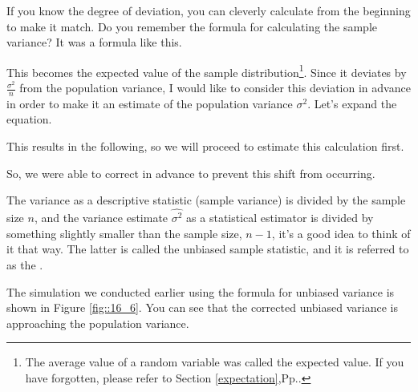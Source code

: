 \documentclass{ltjsbook}
\begin{document}
If you know the degree of deviation, you can cleverly calculate from the beginning to make it match. Do you remember the formula for calculating the sample variance? It was a formula like this.

This becomes the expected value of the sample distribution\footnote{The average value of a random variable was called the expected value. If you have forgotten, please refer to Section \ref{expectation},Pp.\pageref{expectation}.}. Since it deviates by $\frac{\sigma^2}{n}$ from the population variance, I would like to consider this deviation in advance in order to make it an estimate of the population variance $\sigma^2$. Let's expand the equation.

This results in the following, so we will proceed to estimate this calculation first.

So, we were able to correct in advance to prevent this shift from occurring.

The variance as a descriptive statistic (sample variance) is divided by the sample size $n$, and the variance estimate $\hat{\sigma^2}$ as a statistical estimator is divided by something slightly smaller than the sample size, $n-1$, it's a good idea to think of it that way. The latter is called the unbiased sample statistic, and it is referred to as the .

The simulation we conducted earlier using the formula for unbiased variance is shown in Figure \ref{fig::16_6}. You can see that the corrected unbiased variance is approaching the population variance.

\end{document}
